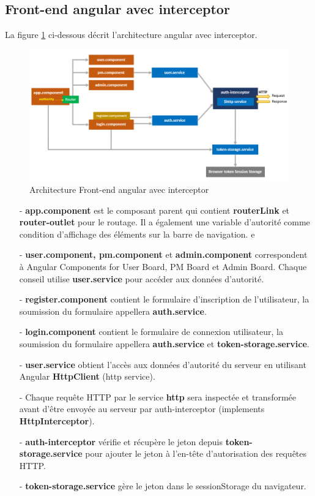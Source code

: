 \subsection{	Front-end angular avec interceptor }
\hspace{4mm}La ﬁgure \ref{fig:arch_frontend} ci-dessous décrit l'architecture angular avec interceptor. \cite{4}
\begin{figure}[h]
    \centering
    \includegraphics{figures/3anis2.png}
    \caption{Architecture Front-end angular avec interceptor \cite{4}}
    \label{fig:arch_frontend}
\end{figure}
\begin{itemize}
    \item[-]\textbf{app.component} est le composant parent qui contient \textbf{routerLink} et \textbf{router-outlet} pour le routage. Il a également une variable d'autorité comme condition d'affichage des éléments sur la barre de navigation. 
e    \item[-]\textbf{user.component, pm.component} et  \textbf{admin.component} correspondent à Angular Components for User Board, PM Board et Admin Board. Chaque conseil utilise \textbf{user.service} pour accéder aux données d'autorité.
    \item[-]\textbf{register.component} contient le formulaire d'inscription de l'utilisateur, la soumission du formulaire appellera \textbf{auth.service}.
    \item[-]\textbf{login.component} contient le formulaire de connexion utilisateur, la soumission du formulaire appellera \textbf{auth.service} et \textbf{token-storage.service}.
    \item[-]\textbf{user.service} obtient l'accès aux données d'autorité du serveur en utilisant Angular \textbf{HttpClient} (http service).
    \item[-]Chaque requête HTTP par le service \textbf{http} sera inspectée et transformée avant d'être envoyée au serveur par auth-interceptor (implements \textbf{HttpInterceptor}).
    \item[-]\textbf{auth-interceptor} vérifie et récupère le jeton depuis \textbf{token-storage.service} pour ajouter le jeton à l'en-tête d'autorisation des requêtes HTTP.
    \item[-]\textbf{token-storage.service} gère le jeton dans le sessionStorage du navigateur.
\end{itemize}
